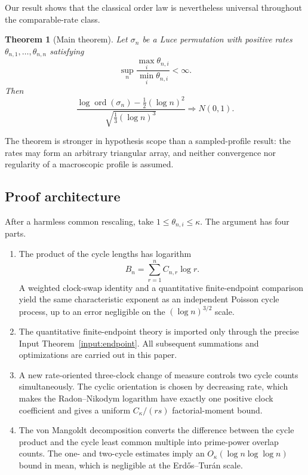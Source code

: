 \documentclass[11pt]{article}
\newtheorem{theorem}{Theorem}[section]
\theoremstyle{remark}
\newcommand{\ord}{\operatorname{ord}}
\begin{document}
Our result shows that the classical order law is nevertheless universal
throughout the comparable-rate class.

\begin{theorem}[Main theorem]\label{thm:main}
Let $\sigma_n$ be a Luce permutation with positive rates
$\theta_{n,1},\ldots,\theta_{n,n}$ satisfying
\[
 \sup_n\frac{\max_i\theta_{n,i}}{\min_i\theta_{n,i}}<\infty.
\]
Then
\[
 \frac{\log\ord(\sigma_n)-\frac12(\log n)^2}
 {\sqrt{\frac13(\log n)^3}}
 \Rightarrow N(0,1).
\]
\end{theorem}

The theorem is stronger in hypothesis scope than a sampled-profile result:
the rates may form an arbitrary triangular array, and neither convergence
nor regularity of a macroscopic profile is assumed.

\subsection*{Proof architecture}

After a harmless common rescaling, take $1\leq\theta_{n,i}\leq\kappa$.
The argument has four parts.

\begin{enumerate}[label=\textnormal{(\roman*)}]
\item The product of the cycle lengths has logarithm
\[
 B_n=\sum_{r=1}^n C_{n,r}\log r.
\]
A weighted clock-swap identity and a quantitative finite-endpoint
comparison yield the same characteristic exponent as an independent
Poisson cycle process, up to an error negligible on the
$(\log n)^{3/2}$ scale.

\item The quantitative finite-endpoint theory is imported only through the
precise Input Theorem~\ref{input:endpoint}.  All subsequent summations and
optimizations are carried out in this paper.

\item A new rate-oriented three-clock change of measure controls two cycle
counts simultaneously.  The cyclic orientation is chosen by decreasing
rate, which makes the Radon--Nikodym logarithm have exactly one positive
clock coefficient and gives a uniform $C_\kappa/(rs)$ factorial-moment
bound.

\item The von Mangoldt decomposition converts the difference between the
cycle product and the cycle least common multiple into prime-power overlap
counts.  The one- and two-cycle estimates imply an $O_\kappa(\log n\log\log
n)$ bound in mean, which is negligible at the Erd\H{o}s--Tur\'an scale.
\end{enumerate}
\end{document}
